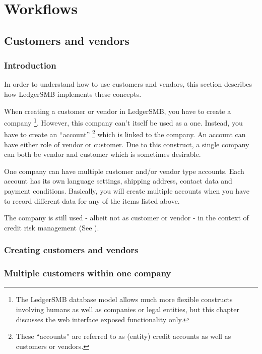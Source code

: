 

\part{Workflows}
\label{part:Workflows}

\chapter{Customers and vendors}

\section{Introduction}

In order to understand how to use customers and vendors, this section describes
how LedgerSMB implements these concepts.

When creating a customer or vendor in LedgerSMB, you have to create a company
\footnote{The LedgerSMB database model allows much more flexible constructs
involving humans as well as companies or legal entities, but this chapter discusses
the web interface exposed functionality only.}. However,
this company can't itself be used as a one. Instead, you have to create an ``account''
\footnote{These ``accounts'' are referred to as (entity) credit accounts as well as
customers or vendors.}
which is linked to the company. An account can have either role of vendor or customer.
Due to this construct, a single company can both be vendor and customer which is
sometimes desirable.

One company can have multiple customer and/or vendor type accounts. Each account has its
own language settings, shipping address, contact data and payment conditions.
Basically, you will create multiple accounts when you have to record different data
for any of the items listed above.

The company is still used - albeit not as customer or vendor - in the context of
credit risk management (See ).

\section{Creating customers and vendors}
\label{sec:creating-customers-and-vendors}

\section{Multiple customers within one company}


